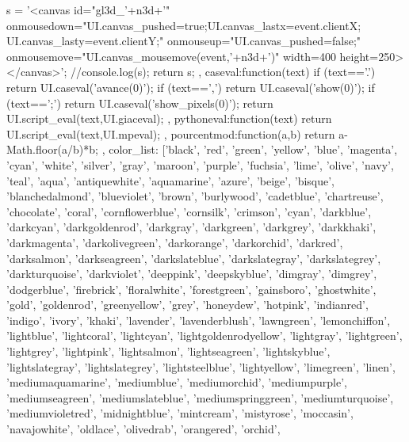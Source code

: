 {{{{{	s = '<canvas id="gl3d_'+n3d+'" onmousedown="UI.canvas_pushed=true;UI.canvas_lastx=event.clientX; UI.canvas_lasty=event.clientY;" onmouseup="UI.canvas_pushed=false;" onmousemove="UI.canvas_mousemove(event,'+n3d+')" width=400 height=250></canvas>';
    }
   //console.log(s);
    return s;
  },
  caseval:function(text){
    if (text=='.') return UI.caseval('avance(0)');
    if (text==',') return UI.caseval('show(0)');
    if (text==';') return UI.caseval('show_pixels(0)');
    return UI.script_eval(text,UI.giaceval);
  },
  pythoneval:function(text){
    return UI.script_eval(text,UI.mpeval);
  },
  pourcentmod:function(a,b){
    return a-Math.floor(a/b)*b;
  },
  color_list: ['black',
    'red',
    'green',
    'yellow',
    'blue',
    'magenta',
    'cyan',
    'white',
    'silver',
    'gray',
    'maroon',
    'purple',
    'fuchsia',
    'lime',
    'olive',
    'navy',
    'teal',
    'aqua',
    'antiquewhite',
    'aquamarine',
    'azure',
    'beige',
    'bisque',
    'blanchedalmond',
    'blueviolet',
    'brown',
    'burlywood',
    'cadetblue',
    'chartreuse',
    'chocolate',
    'coral',
    'cornflowerblue',
    'cornsilk',
    'crimson',
    'cyan',
    'darkblue',
    'darkcyan',
    'darkgoldenrod',
    'darkgray',
    'darkgreen',
    'darkgrey',
    'darkkhaki',
    'darkmagenta',
    'darkolivegreen',
    'darkorange',
    'darkorchid',
    'darkred',
    'darksalmon',
    'darkseagreen',
    'darkslateblue',
    'darkslategray',
    'darkslategrey',
    'darkturquoise',
    'darkviolet',
    'deeppink',
    'deepskyblue',
    'dimgray',
    'dimgrey',
    'dodgerblue',
    'firebrick',
    'floralwhite',
    'forestgreen',
    'gainsboro',
    'ghostwhite',
    'gold',
    'goldenrod',
    'greenyellow',
    'grey',
    'honeydew',
    'hotpink',
    'indianred',
    'indigo',
    'ivory',
    'khaki',
    'lavender',
    'lavenderblush',
    'lawngreen',
    'lemonchiffon',
    'lightblue',
    'lightcoral',
    'lightcyan',
    'lightgoldenrodyellow',
    'lightgray',
    'lightgreen',
    'lightgrey',
    'lightpink',
    'lightsalmon',
    'lightseagreen',
    'lightskyblue',
    'lightslategray',
    'lightslategrey',
    'lightsteelblue',
    'lightyellow',
    'limegreen',
    'linen',
    'mediumaquamarine',
    'mediumblue',
    'mediumorchid',
    'mediumpurple',
    'mediumseagreen',
    'mediumslateblue',
    'mediumspringgreen',
    'mediumturquoise',
    'mediumvioletred',
    'midnightblue',
    'mintcream',
    'mistyrose',
    'moccasin',
    'navajowhite',
    'oldlace',
    'olivedrab',
    'orangered',
    'orchid',
}}}
